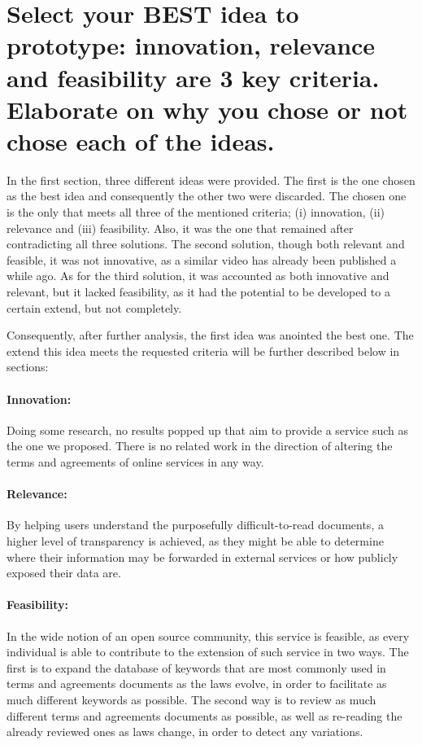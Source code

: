 \section{Select your BEST idea to prototype: innovation, relevance and 
feasibility are 3 key criteria. Elaborate on why you chose or not chose each of 
the ideas.}
\label{s_2}

In the first section, three different ideas were provided. The first is the one 
chosen as the best idea and consequently the other two were discarded. The 
chosen one is the only that meets all three of the mentioned criteria; 
(i) innovation, (ii) relevance and (iii) feasibility. Also, it was the one that 
remained after contradicting all three solutions. 
The second solution, though both relevant and feasible, it was not innovative, 
as a similar video has already been published a while ago. As for the third 
solution, it was accounted as both innovative and relevant, but it lacked 
feasibility, as it had the potential to be developed to a certain extend, but 
not completely.

Consequently, after further analysis, the first idea was anointed the best one. 
The extend this idea meets the requested criteria will be further described 
below in sections:
\paragraph{Innovation:} Doing some research, no results popped up that aim to 
provide a service such as the one we proposed. There is no related work in the 
direction of altering the terms and agreements of online services in any way.
\paragraph{Relevance:} By helping users understand the purposefully 
difficult-to-read documents, a higher level of transparency is achieved, as they 
might be able to determine where their information may be forwarded in external 
services or how publicly exposed their data are. 
\paragraph{Feasibility:} In the wide notion of an open source community, this 
service is feasible, as every individual is able to contribute to the extension 
of such service in two ways. The first is to expand the database of keywords 
that are most commonly used in terms and agreements documents as the laws 
evolve, in order to facilitate as much different keywords as possible. The 
second way is to review as much different terms and agreements documents as 
possible, as well as re-reading the already reviewed ones as laws change, in 
order to detect any variations.

